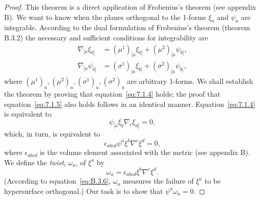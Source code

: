 \begin{proof}
This theorem is a direct application of Frobenius's theorem (see appendix B). We
want to know when the planes orthogonal to the 1-forms \(\xi_a\) and \(\psi_a\) are
integrable. According to the dual formulation of Frobenius's theorem (theorem
B.3.2) the necessary and sufficient conditions for integrability are
\begin{align}
  \nabla_{[a}\xi_{b]}&=(\mu^1)_{[a}\xi_{b]}+(\mu^2)_{[a}\psi_{b]} ,
    \tag{7.1.4}\label{eq:7.1.4}\\
  \nabla_{[a}\psi_{b]}&=(\sigma^1)_{[a}\xi_{b]}+(\sigma^2)_{[a}\psi_{b]} ,
    \tag{7.1.5}\label{eq:7.1.5}
\end{align}
where \((\mu^1)_a,(\mu^2)_a,(\sigma^1)_a,(\sigma^2)_a\) are arbitrary 1-forms. We
shall establish the theorem by proving that equation~\eqref{eq:7.1.4} holds; the proof
that equation~\eqref{eq:7.1.5} also holds follows in an identical manner.
Equation~\eqref{eq:7.1.4} is equivalent to
\begin{equation}
  \psi_{[a}\xi_b\nabla_c\xi_{d]}=0 ,
  \tag{7.1.6}\label{eq:7.1.6}
\end{equation}
which, in turn, is equivalent to
\begin{equation}
  \epsilon_{abcd}\psi^a\xi^b\nabla^c\xi^d=0 ,
  \tag{7.1.7}\label{eq:7.1.7}
\end{equation}
where \(\epsilon_{abcd}\) is the volume element associated with the metric (see
appendix B). We define the \emph{twist}, \(\omega_a\), of \(\xi^a\) by
\begin{equation}
  \omega_a=\epsilon_{abcd}\xi^b\nabla^c\xi^d .
  \tag{7.1.8}\label{eq:7.1.8}
\end{equation}
(According to equation~\eqref{eq:B.3.6}, \(\omega_a\) measures the failure of
\(\xi^a\) to be hypersurface orthogonal.) Our task is to show that
\(\psi^a\omega_a=0\).


\end{proof}
